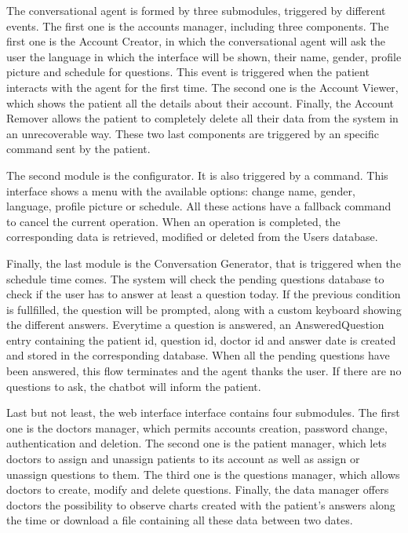 \documentclass[12pt,english]{article}
\begin{document}
The conversational agent is formed by three submodules, triggered by different events. The first one is the accounts manager, including three components. The first one is the Account Creator, in which the conversational agent will ask the user the language in which the interface will be shown, their name, gender, profile picture and schedule for questions. This event is triggered when the patient interacts with the agent for the first time. The second one is the Account Viewer, which shows the patient all the details about their account. Finally, the Account Remover allows the patient to completely delete all their data from the system in an unrecoverable way. These two last components are triggered by an specific command sent by the patient.

The second module is the configurator. It is also triggered by a command. This interface shows a menu with the available options: change name, gender, language, profile picture or schedule. All these actions have a fallback command to cancel the current operation. When an operation is completed, the corresponding data is retrieved, modified or deleted from the Users database.

Finally, the last module is the Conversation Generator, that is triggered when the schedule time comes. The system will check the pending questions database to check if the user has to answer at least a question today. If the previous condition is fullfilled, the question will be prompted, along with a custom keyboard showing the different answers. Everytime a question is answered, an AnsweredQuestion entry containing the patient id, question id, doctor id and answer date is created and stored in the corresponding database. When all the pending questions have been answered, this flow terminates and the agent thanks the user. If there are no questions to ask, the chatbot will inform the patient.

Last but not least, the web interface interface contains four submodules. The first one is the doctors manager, which permits accounts creation, password change, authentication and deletion. The second one is the patient manager, which lets doctors to assign and unassign patients to its account as well as assign or unassign questions to them. The third one is the questions manager, which allows doctors to create, modify and delete questions. Finally, the data manager offers doctors the possibility to observe charts created with the patient's answers along the time or download a file containing all these data between two dates.
\end{document}
